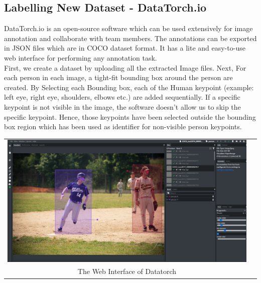 \documentclass[a4paper,12pt]{article}
\begin{document}
\subsection{Labelling New Dataset - DataTorch.io}
DataTorch.io is an open-source software which can be used extensively for image annotation and collaborate with team members. The annotations can be exported in JSON files which are in COCO dataset format. It has a lite and easy-to-use web interface for performing any annotation task.
\\
First, we create a dataset by uploading all the extracted Image files.
Next, For each person in each image,  a tight-fit bounding box around the person are created. By Selecting each Bounding box, each of the Human keypoint (example: left eye, right eye, shoulders, elbows etc.) are added sequentially. If a specific keypoint is not visible in the image, the software doesn't allow us to skip the specific keypoint. Hence, those keypoints have been selected outside the bounding box region which has been used as identifier for non-visible person keypoints. 

\begin{center}
\begin{tabular}{cc}
\includegraphics[width=\textwidth]{datatorch_ui.PNG}

\\
The Web Interface of Datatorch
\end{tabular}
\end{center}
\end{document}
